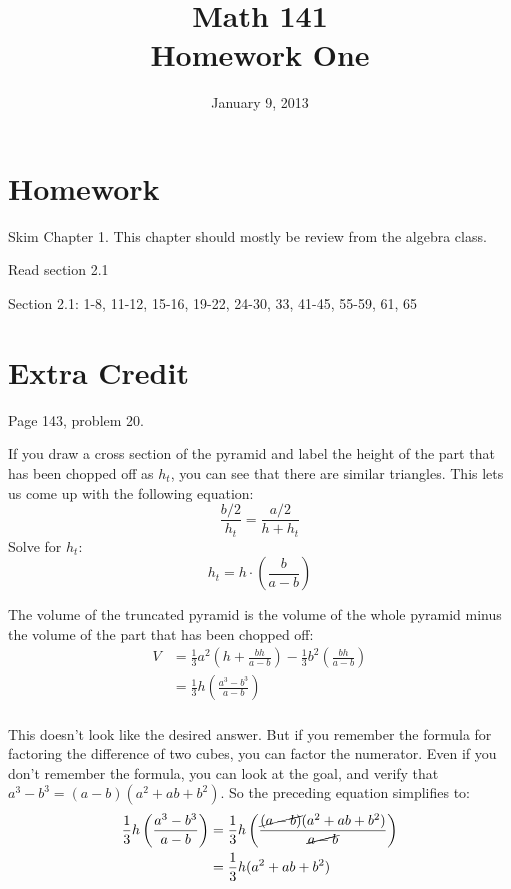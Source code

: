 \documentclass{exam}
\author{}
\date{January 9, 2013}
\title{Math 141 \\ Homework One}
\begin{document}
\maketitle

\section{Homework}

\begin{itemize*}
  \item Skim Chapter 1.  This chapter should mostly be review from the algebra class.
  \item Read section 2.1
  \item Section 2.1: 1-8, 11-12, 15-16, 19-22, 24-30, 33, 41-45, 55-59, 61, 65
\end{itemize*}

\section{Extra Credit}

Page 143, problem 20.

\ifprintanswers
  \begin{solution}
    If you draw a cross section of the pyramid and label the height of the part that has been chopped off as $h_t$, you
    can see that there are similar triangles.  This lets us come up with the following equation:
    \[
      \frac{b/2}{h_t} = \frac{a/2}{h + h_t}
    \]
    Solve for $h_t$:
    \[
      h_t = h \cdot \left( \frac{b}{a - b} \right)
    \]

    The volume of the truncated pyramid is the volume of the whole pyramid minus the volume of the part that has been
    chopped off:
    \begin{align*}
      V &= \frac{1}{3} a^2 \left(h + \frac{bh}{a - b} \right) - \frac{1}{3} b^2 \left( \frac{bh}{a - b} \right) \\
      &= \frac{1}{3} h \left( \frac{a^3 - b^3}{a - b} \right) \\
    \end{align*}

    This doesn't look like the desired answer.  But if you remember the formula for factoring the difference of two cubes,
    you can factor the numerator.  Even if you don't remember the formula, you can look at the goal, and verify that
    $a^3 - b^3 = (a - b)(a^2 + ab + b^2)$.  So the preceding equation simplifies to:
    \begin{align*}
      \frac{1}{3} h \left( \frac{a^3 - b^3}{a - b} \right) 
        &= \frac{1}{3} h \left( \frac{\cancel{(a - b)}(a^2 + ab + b^2)}{\cancel{a - b}} \right) \\
        &= \frac{1}{3} h (a^2 + ab + b^2) \\
    \end{align*}
  \end{solution}
\end{document}
